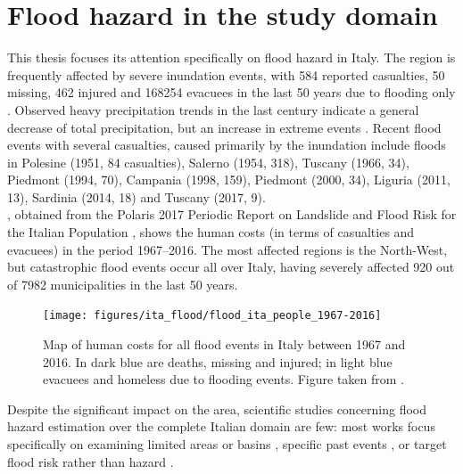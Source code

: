 \section{Flood hazard in the study domain}
This thesis focuses its attention specifically on flood hazard in Italy. The region is frequently affected by severe inundation events, with 584 reported casualties, 50 missing, 462 injured and 168254 evacuees in the last 50 years due to flooding only \citep[excluding flood-induced landslides, see][]{IRPI2018}. Observed heavy precipitation trends in the last century indicate a general decrease of total precipitation, but an increase in extreme events \citep{Brunetti2004, Brunetti2001, Brunetti2004a}. Recent flood events with several casualties, caused primarily by the inundation include floods in
Polesine (1951, 84 casualties),
Salerno (1954, 318),
Tuscany (1966, 34),
Piedmont (1994, 70),
Campania (1998, 159),
Piedmont (2000, 34),
Liguria (2011, 13),
Sardinia (2014, 18) and
Tuscany (2017, 9).\\
, obtained from the Polaris 2017 Periodic Report on Landslide and Flood Risk for the Italian Population \citep{IRPI2018}, shows the human costs (in terms of casualties and evacuees) in the period 1967--2016. The most affected regions is the  North-West, but catastrophic flood events occur all over Italy, having severely affected 920 out of 7982 municipalities in the last 50 years.

\begin{figure}
    \centering
    \texttt{[image: figures/ita\_flood/flood\_ita\_people\_1967-2016]}
    \decoRule
    \caption[Human costs of floods in Italy, 1967--2016]{Map of human costs for all flood events in Italy between 1967 and 2016. In dark blue are deaths, missing and injured; in light blue evacuees and homeless due to flooding events. Figure taken from \citet[][page 14]{IRPI2018}.}
    \label{fig:flood_events_ita}
\end{figure}

Despite the significant impact on the area, scientific studies concerning flood hazard estimation over the complete Italian domain are few: most works focus specifically on examining limited areas or basins \citep{Sole2008, Marchesini2016, Morelli2014, DiSalvo2017}, specific past events \citep{Marchi2010, Santo2012, Masoero2013, Amadio2013, Norbiato2007}, or target flood risk rather than hazard \citep{Salvati2010, Albano2017, Dottori2016}.

